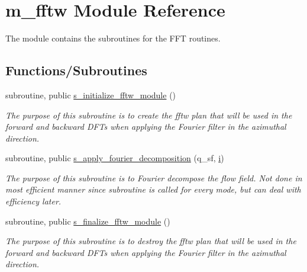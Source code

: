 \hypertarget{namespacem__fftw}{}\section{m\+\_\+fftw Module Reference}
\label{namespacem__fftw}


The module contains the subroutines for the F\+FT routines.  


\subsection*{Functions/\+Subroutines}
\begin{DoxyCompactItemize}
\item 
subroutine, public \hyperlink{namespacem__fftw_a6f924722e9573d6526d5d1ba173f4ac6}{s\+\_\+initialize\+\_\+fftw\+\_\+module} ()
\begin{DoxyCompactList}\small\item\em The purpose of this subroutine is to create the fftw plan that will be used in the forward and backward D\+F\+Ts when applying the Fourier filter in the azimuthal direction. \end{DoxyCompactList}\item 
subroutine, public \hyperlink{namespacem__fftw_a23c9c885c472ef518a89306f78dab97c}{s\+\_\+apply\+\_\+fourier\+\_\+decomposition} (q\+\_\+sf, \hyperlink{m__data__output_8f90_aaea4baed8fd8b780f6938f0dc1fb0f72}{i})
\begin{DoxyCompactList}\small\item\em The purpose of this subroutine is to Fourier decompose the flow field. Not done in most efficient manner since subroutine is called for every mode, but can deal with efficiency later. \end{DoxyCompactList}\item 
subroutine, public \hyperlink{namespacem__fftw_a0666fa4d38fb46540fd108b76e835b45}{s\+\_\+finalize\+\_\+fftw\+\_\+module} ()
\begin{DoxyCompactList}\small\item\em The purpose of this subroutine is to destroy the fftw plan that will be used in the forward and backward D\+F\+Ts when applying the Fourier filter in the azimuthal direction. \end{DoxyCompactList}\end{DoxyCompactItemize}
